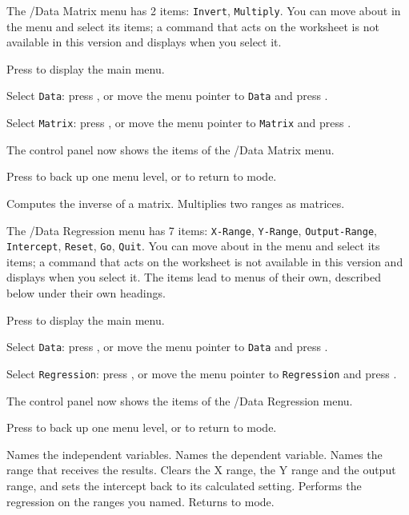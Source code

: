 The /Data Matrix menu has 2 items: \texttt{Invert}, \texttt{Multiply}.  You can move about in the menu and select its items; a command that acts on the worksheet is not available in this version and displays  when you select it.
\begin{Steps123}
\item Press  to display the main menu.
\item Select \texttt{Data}: press , or move the menu pointer to \texttt{Data} and press .
\item Select \texttt{Matrix}: press , or move the menu pointer to \texttt{Matrix} and press .
\item The control panel now shows the items of the /Data Matrix menu.
\item Press  to back up one menu level, or  to return to  mode.
\end{Steps123}
\begin{Options}
 Computes the inverse of a matrix.
 Multiplies two ranges as matrices.
\end{Options}

The /Data Regression menu has 7 items: \texttt{X-Range}, \texttt{Y-Range}, \texttt{Output-Range}, \texttt{Intercept}, \texttt{Reset}, \texttt{Go}, \texttt{Quit}.  You can move about in the menu and select its items; a command that acts on the worksheet is not available in this version and displays  when you select it.
The items  lead to menus of their own, described below under their own headings.
\begin{Steps123}
\item Press  to display the main menu.
\item Select \texttt{Data}: press , or move the menu pointer to \texttt{Data} and press .
\item Select \texttt{Regression}: press , or move the menu pointer to \texttt{Regression} and press .
\item The control panel now shows the items of the /Data Regression menu.
\item Press  to back up one menu level, or  to return to  mode.
\end{Steps123}
\begin{Options}
 Names the independent variables.
 Names the dependent variable.
 Names the range that receives the results.
 Clears the X range, the Y range and the output range, and sets the intercept back to its calculated setting.
 Performs the regression on the ranges you named.
 Returns to  mode.
\end{Options}

